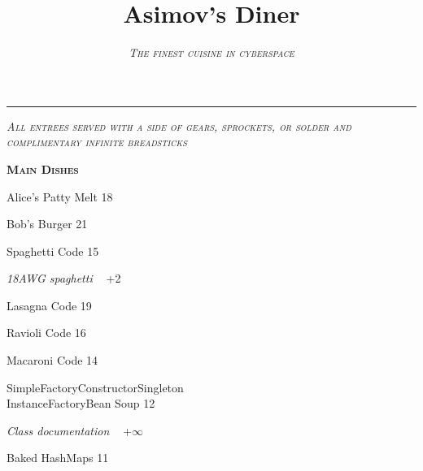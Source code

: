 \documentclass[11pt]{article}
\title{\fontsize{1.2cm}{11pt}\fontspec{Consolas} Asimov's Diner}
\author{\fontspec{Consolas}\textsc{\textit{The finest cuisine in cyberspace}}}
\date{}
\begin{document}
\begin{center}
\quad
{}\quad
{}
\end{center}

{\let\newpage\relax\maketitle}

\thispagestyle{empty}

\begin{center}
\rule{\textwidth}{0.5pt}
\end{center}

\begin{center}
\textsc{\textit{All entrees served with a side of gears, sprockets, or solder and\\ complimentary infinite breadsticks}}
\vspace{0.8cm}

\begin{minipage}{8cm}
\begin{center}
\textsc{\textbf{Main Dishes}}
\end{center}
Alice's Patty Melt \hfill 18 \vspace{0.1cm}

Bob's Burger \hfill 21 \vspace{0.1cm}

Spaghetti Code \hfill 15 \vspace{0.01cm}

{\fontsize{3mm}{11pt}\selectfont\textit{\:18AWG spaghetti \ } +2} \vspace{0.1cm}

Lasagna Code \hfill 19 \vspace{0.1cm}

Ravioli Code \hfill 16 \vspace{0.1cm}

Macaroni Code \hfill 14 \vspace{0.1cm}

SimpleFactoryConstructorSingleton\\InstanceFactoryBean Soup \hfill 12 \vspace{0.01cm}

{\fontsize{3mm}{11pt}\selectfont\textit{\:Class documentation \ } +$\infty$} \vspace{0.1cm}

Baked HashMaps \hfill 11 \vspace{0.01cm}


\end{minipage}
\end{center}
\end{document}
